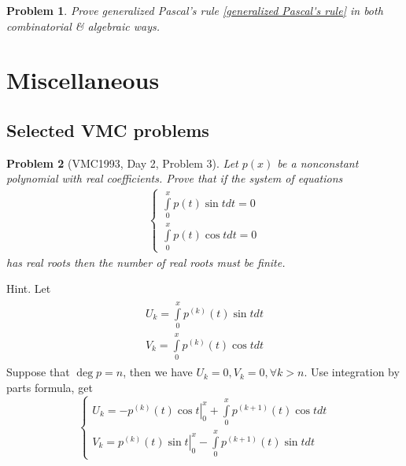 \documentclass{article}
\newtheorem{problem}{Problem}
\begin{document}
\begin{problem}
	Prove generalized Pascal's rule \eqref{generalized Pascal's rule} in both combinatorial \& algebraic ways.
\end{problem}


\section{Miscellaneous}

\subsection{Selected VMC problems}

\begin{problem}[VMC1993, Day 2, Problem 3]
	Let $p(x)$ be a nonconstant polynomial with real coefficients. Prove that if the system of equations
	\begin{align}
		\left\{ {\begin{array}{*{20}{c}}
				{\int\limits_0^x {p\left( t \right)\sin tdt = 0} }\\
				{\int\limits_0^x {p\left( t \right)\cos tdt = 0} }
		\end{array}} \right.
	\end{align}
	has real roots then the number of real roots must be finite.
\end{problem}
{\sf Hint.} Let 
\begin{align}
	\begin{array}{l}
		{U_k} = \int\limits_0^x {{p^{\left( k \right)}}\left( t \right)\sin t} dt\\
		{V_k} = \int\limits_0^x {{p^{\left( k \right)}}\left( t \right)\cos t} dt
	\end{array}
\end{align}
Suppose that $\deg p=n$, then we have ${U_k} = 0,{V_k} = 0,\forall k > n$. Use integration by parts formula, get
\begin{equation}
	\label{2.1}
	\left\{ \begin{array}{l}
		{U_k} = \left. { - {p^{\left( k \right)}}\left( t \right)\cos t} \right|_0^x + \int\limits_0^x {{p^{\left( {k + 1} \right)}}\left( t \right)\cos t} dt\\
		{V_k} = \left. {{p^{\left( k \right)}}\left( t \right)\sin t} \right|_0^x - \int\limits_0^x {{p^{\left( {k + 1} \right)}}\left( t \right)\sin t} dt
	\end{array} \right.
\end{equation}
\end{document}
